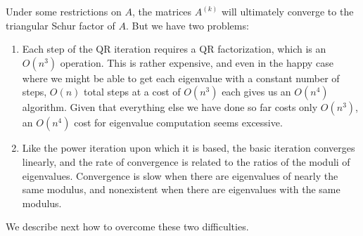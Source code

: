 \documentclass[12pt, leqno]{article} %
\begin{document}
Under some restrictions on $A$, the matrices $A^{(k)}$ will ultimately
converge to the triangular Schur factor of $A$.  But we have two problems:
\begin{enumerate}
\item
  Each step of the QR iteration requires a QR factorization, which is
  an $O(n^3)$ operation.  This is rather expensive, and even in the happy
  case where we might be able to get each eigenvalue with a constant
  number of steps, $O(n)$ total steps at a cost of $O(n^3)$ each gives
  us an $O(n^4)$ algorithm.  Given that everything else we have done
  so far costs only $O(n^3)$, an $O(n^4)$ cost for eigenvalue computation
  seems excessive.
\item
  Like the power iteration upon which it is based, the basic iteration
  converges linearly, and the rate of convergence is related to the
  ratios of the moduli of eigenvalues.  Convergence is slow when there
  are eigenvalues of nearly the same modulus, and nonexistent when
  there are eigenvalues with the same modulus.
\end{enumerate}
We describe next how to overcome these two difficulties.
\end{document}
